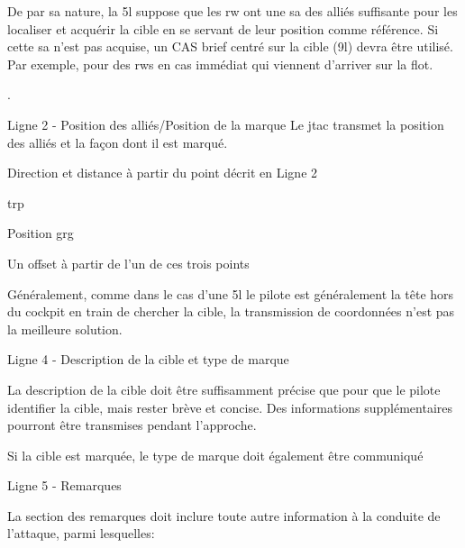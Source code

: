 \begin{e1}
	\item De par sa nature, la \gls{5l} suppose que les \gls{rw} ont une \gls{sa} des alliés suffisante pour les localiser et acquérir la cible en se servant de leur position comme référence. Si cette \gls{sa} n'est pas acquise, un CAS brief centré sur la cible (\gls{9l}) devra être utilisé. Par exemple, pour des \glspl{rw} en \gls{cas} immédiat qui viennent d'arriver sur la \gls{flot}.
	\begin{e2}
		.
		\item{Ligne 2 - Position des alliés/Position de la marque}{
		Le \gls{jtac} transmet la position des alliés et la façon dont il est marqué.}
		\begin{e3}
			\item Direction et distance à partir du point décrit en Ligne 2
			\item \gls{trp}
			\item Position \gls{grg}
			\item Un offset à partir de l'un de ces trois points
		\end{e3}
		Généralement, comme dans le cas d'une \gls{5l} le pilote est généralement la tête hors du cockpit en train de chercher la cible, la transmission de coordonnées n'est pas la meilleure solution.
		\item Ligne 4 - Description de la cible et type de marque
		\begin{e3}
			\item La description de la cible doit être suffisamment précise que pour que le pilote identifier la cible, mais rester brève et concise. Des informations supplémentaires pourront être transmises pendant l'approche.
			\item Si la cible est marquée, le type de marque doit également être communiqué
		\end{e3}
		\item Ligne 5 - Remarques
		\begin{e3}
			\item La section des remarques doit inclure toute autre information à la conduite de l'attaque, parmi lesquelles:

\end{e3}
\end{e2}
\end{e1}

